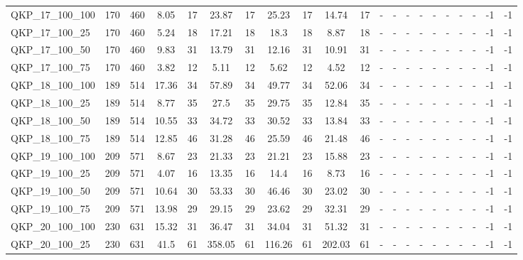 \begin{sidewaystable}[!ht]
{\begin{tabular}{lcccccccccccccccccccc}
QKP\_17\_100\_100 & 170 & 460 &  \textcolor{blue2}{8.05} & 17 & 23.87 & 17 & 25.23 & 17 & 14.74 & 17 &  - &  - &  - &  - &  - &  - &  - &  - & -1 & -1 \\
QKP\_17\_100\_25 & 170 & 460 &  \textcolor{blue2}{5.24} & 18 & 17.21 & 18 & 18.3 & 18 & 8.87 & 18 &  - &  - &  - &  - &  - &  - &  - &  - & -1 & -1 \\
QKP\_17\_100\_50 & 170 & 460 &  \textcolor{blue2}{9.83} & 31 & 13.79 & 31 & 12.16 & 31 & 10.91 & 31 &  - &  - &  - &  - &  - &  - &  - &  - & -1 & -1 \\
QKP\_17\_100\_75 & 170 & 460 &  \textcolor{blue2}{3.82} & 12 & 5.11 & 12 & 5.62 & 12 & 4.52 & 12 &  - &  - &  - &  - &  - &  - &  - &  - & -1 & -1 \\
QKP\_18\_100\_100 & 189 & 514 &  \textcolor{blue2}{17.36} & 34 & 57.89 & 34 & 49.77 & 34 & 52.06 & 34 &  - &  - &  - &  - &  - &  - &  - &  - & -1 & -1 \\
QKP\_18\_100\_25 & 189 & 514 &  \textcolor{blue2}{8.77} & 35 & 27.5 & 35 & 29.75 & 35 & 12.84 & 35 &  - &  - &  - &  - &  - &  - &  - &  - & -1 & -1 \\
QKP\_18\_100\_50 & 189 & 514 &  \textcolor{blue2}{10.55} & 33 & 34.72 & 33 & 30.52 & 33 & 13.84 & 33 &  - &  - &  - &  - &  - &  - &  - &  - & -1 & -1 \\
QKP\_18\_100\_75 & 189 & 514 &  \textcolor{blue2}{12.85} & 46 & 31.28 & 46 & 25.59 & 46 & 21.48 & 46 &  - &  - &  - &  - &  - &  - &  - &  - & -1 & -1 \\
QKP\_19\_100\_100 & 209 & 571 &  \textcolor{blue2}{8.67} & 23 & 21.33 & 23 & 21.21 & 23 & 15.88 & 23 &  - &  - &  - &  - &  - &  - &  - &  - & -1 & -1 \\
QKP\_19\_100\_25 & 209 & 571 &  \textcolor{blue2}{4.07} & 16 & 13.35 & 16 & 14.4 & 16 & 8.73 & 16 &  - &  - &  - &  - &  - &  - &  - &  - & -1 & -1 \\
QKP\_19\_100\_50 & 209 & 571 &  \textcolor{blue2}{10.64} & 30 & 53.33 & 30 & 46.46 & 30 & 23.02 & 30 &  - &  - &  - &  - &  - &  - &  - &  - & -1 & -1 \\
QKP\_19\_100\_75 & 209 & 571 &  \textcolor{blue2}{13.98} & 29 & 29.15 & 29 & 23.62 & 29 & 32.31 & 29 &  - &  - &  - &  - &  - &  - &  - &  - & -1 & -1 \\
QKP\_20\_100\_100 & 230 & 631 &  \textcolor{blue2}{15.32} & 31 & 36.47 & 31 & 34.04 & 31 & 51.32 & 31 &  - &  - &  - &  - &  - &  - &  - &  - & -1 & -1 \\
QKP\_20\_100\_25 & 230 & 631 &  \textcolor{blue2}{41.5} & 61 & 358.05 & 61 & 116.26 & 61 & 202.03 & 61 &  - &  - &  - &  - &  - &  - &  - &  - & -1 & -1 \\

\end{tabular}}
\end{sidewaystable}

